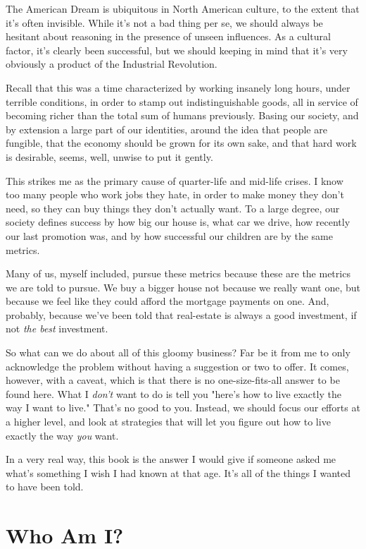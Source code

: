 \documentclass[]{book}
\begin{document}
The American Dream is ubiquitous in North American culture, to the extent that
it's often invisible. While it's not a bad thing per se, we should
always be hesitant about reasoning in the presence of unseen influences. As a
cultural factor, it's clearly been successful, but we should keeping in mind
that it's very obviously a product of the Industrial Revolution.

Recall that this was a time characterized by working insanely long hours, under
terrible conditions, in order to stamp out indistinguishable goods, all in
service of becoming richer than the total sum of humans previously. Basing our
society, and by extension a large part of our identities, around the idea that
people are fungible, that the economy should be grown for its own sake, and that
hard work is desirable, seems, well, unwise to put it gently.

This strikes me as the primary cause of quarter-life and mid-life crises. I know
too many people who work jobs they hate, in order to make money they don't need,
so they can buy things they don't actually want. To a large degree, our society
defines success by how big our house is, what car we drive, how recently our
last promotion was, and by how successful our children are by the same metrics.

Many of us, myself included, pursue these metrics because these are the metrics
we are told to pursue. We buy a bigger house not because we really want one, but
because we feel like they could afford the mortgage payments on one. And,
probably, because we've been told that real-estate is always a good investment,
if not \emph{the best} investment.

So what can we do about all of this gloomy business? Far be it from me to only
acknowledge the problem without having a suggestion or two to offer. It comes,
however, with a caveat, which is that there is no one-size-fits-all answer to be
found here. What I \emph{don't} want to do is tell you "here's how to live
exactly the way I want to live." That's no good to you. Instead, we should focus
our efforts at a higher level, and look at strategies that will let you figure
out how to live exactly the way \emph{you} want.

In a very real way, this book is the answer I would give if someone asked me
what's something I wish I had known at that age. It's all of the things I wanted
to have been told.

\section*{Who Am I?}
\end{document}
